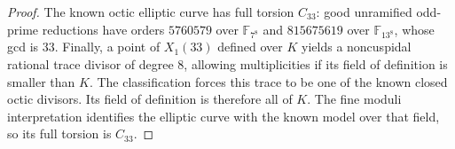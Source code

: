 \begin{proof}
The known octic elliptic curve has full torsion $C_{33}$:
good unramified odd-prime reductions have orders $5760579$ over
$\mathbb F_{7^8}$ and $815675619$ over $\mathbb F_{13^8}$,
whose gcd is $33$.
Finally, a point of $X_1(33)$ defined over $K$ yields a noncuspidal
rational trace divisor of degree $8$, allowing multiplicities if
its field of definition is smaller than $K$.
The classification forces this trace to be one of the known closed
octic divisors. Its field of definition is therefore all of $K$.
The fine moduli interpretation identifies the elliptic curve with
the known model over that field, so its full torsion is $C_{33}$.
\end{proof}
